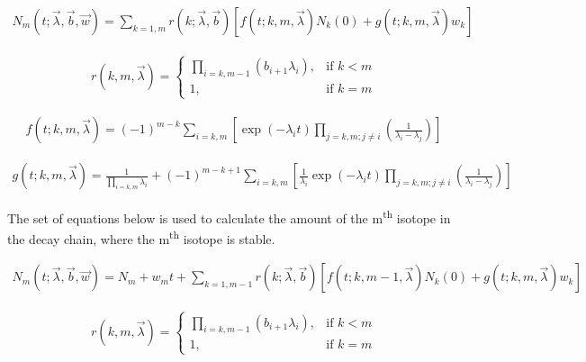 \documentclass[12pt,twoside]{manual}
\begin{document}
\begin{equation}
\begin{split}
N_{m}(t; \vec{\lambda}, \vec{b}, \vec{w})
= \sum_{k=1,m} r(k; \vec{\lambda}, \vec{b}) \left[ f(t; k,m,\vec{\lambda}) N_{k}(0) + g(t;k,m,\vec{\lambda}) w_{k} \right ]
\end{split}
\end{equation}

\begin{equation}
\begin{split}
r(k,m,\vec{\lambda}) =
\begin{cases}
\prod_{i=k,m-1} \left( b_{i+1} \lambda_{i} \right) , & \text{if } k < m\\
1, & \text{if }k = m
\end{cases}
\end{split}
\end{equation}

\begin{equation}
\begin{split}
f(t;k,m,\vec{\lambda})
=
(-1)^{m-k}
\sum_{i=k,m}
\left[
\exp(-\lambda_i t)
\prod_{j=k,m;j\neq i}
\left(
\frac{1}{\lambda_i-\lambda_j}
\right )
\right ]
\end{split}
\end{equation}

\begin{equation}
\begin{split}
g(t;k,m,\vec{\lambda})
= \frac{1}{\prod_{i=k,m} \lambda_i }
+ \left( -1 \right)^{m-k+1}
\sum_{i=k,m}
\left[
\frac{1}{\lambda_i }
\exp(-\lambda_i t)
\prod_{j=k,m;j\neq i}
\left(
\frac{1}{\lambda_i - \lambda_j}
\right )
\right]
\end{split}
\end{equation}

The set of equations below is used to calculate the amount of the m\textsuperscript{th} isotope in the decay chain, where the m\textsuperscript{th} isotope is stable.

\begin{equation}
\begin{split}
N_{m}(t; \vec{\lambda}, \vec{b}, \vec{w})
= N_{m} + w_{m} t +
\sum_{k=1,m-1} r(k; \vec{\lambda}, \vec{b}) \left[ f(t; k,m-1,\vec{\lambda}) N_{k}(0) + g(t;k,m,\vec{\lambda}) w_{k} \right ]
\end{split}
\end{equation}

\begin{equation}
\begin{split}
r(k,m,\vec{\lambda}) =
\begin{cases}
\prod_{i=k,m-1} \left( b_{i+1} \lambda_{i} \right) , & \text{if } k < m\\
1, & \text{if }k = m
\end{cases}
\end{split}
\end{equation}
\end{document}
